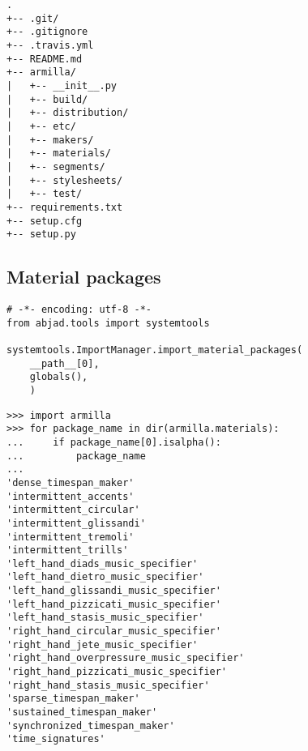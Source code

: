 \begin{singlespacing}
\vspace{-0.5\baselineskip}
\begin{lstlisting}
.
+-- .git/
+-- .gitignore
+-- .travis.yml
+-- README.md
+-- armilla/
|   +-- __init__.py
|   +-- build/
|   +-- distribution/
|   +-- etc/
|   +-- makers/
|   +-- materials/
|   +-- segments/
|   +-- stylesheets/
|   +-- test/
+-- requirements.txt
+-- setup.cfg
+-- setup.py
\end{lstlisting}
\end{singlespacing}

\subsection{Material packages}

\begin{singlespacing}
\vspace{-0.5\baselineskip}
\begin{lstlisting}
# -*- encoding: utf-8 -*-
from abjad.tools import systemtools

systemtools.ImportManager.import_material_packages(
    __path__[0],
    globals(),
    )
\end{lstlisting}
\end{singlespacing}

\begin{comment}
<abjad>
import armilla
for package_name in dir(armilla.materials):
    if package_name[0].isalpha():
        package_name

</abjad>
\end{comment}

\begin{singlespacing}
\vspace{-0.5\baselineskip}
\begin{lstlisting}
>>> import armilla
>>> for package_name in dir(armilla.materials):
...     if package_name[0].isalpha():
...         package_name
...
'dense_timespan_maker'
'intermittent_accents'
'intermittent_circular'
'intermittent_glissandi'
'intermittent_tremoli'
'intermittent_trills'
'left_hand_diads_music_specifier'
'left_hand_dietro_music_specifier'
'left_hand_glissandi_music_specifier'
'left_hand_pizzicati_music_specifier'
'left_hand_stasis_music_specifier'
'right_hand_circular_music_specifier'
'right_hand_jete_music_specifier'
'right_hand_overpressure_music_specifier'
'right_hand_pizzicati_music_specifier'
'right_hand_stasis_music_specifier'
'sparse_timespan_maker'
'sustained_timespan_maker'
'synchronized_timespan_maker'
'time_signatures'
\end{lstlisting}
\end{singlespacing}

